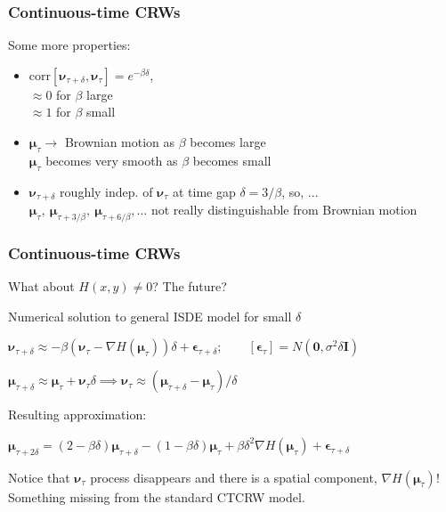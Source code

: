 \documentclass[36pt]{beamer}
\newcommand{\ft}[1]{\frametitle{#1}}
\newcommand{\bigsep}{\itemsep=1.5\baselineskip}
\newcommand{\bmu}{\boldsymbol{\mu}}
\newcommand{\be}{\boldsymbol{\epsilon}}
\newcommand{\bv}{\boldsymbol{\nu}}
\begin{document}
\begin{frame}
\ft{Continuous-time CRWs}
Some more properties: 
\medskip

\begin{itemize}
\bigsep
\item $\mbox{corr}[\bv_{\tau+\delta},\bv_\tau] = e^{-\beta\delta}$,\\
$\approx 0$ for $\beta$ large\\
$\approx 1$ for $\beta$ small
\pause
\item $\bmu_\tau \to$ Brownian motion as $\beta$ becomes large\\
$\bmu_\tau$ becomes very smooth as $\beta$ becomes small
\pause
\item $\bv_{\tau+\delta}$ roughly indep. of $\bv_\tau$ at time gap $\delta = 3/\beta$, so, ...\medskip \\
$\bmu_\tau,\ \bmu_{\tau+3/\beta},\ \bmu_{\tau+6/\beta},\dots$ not really distinguishable from Brownian motion
\end{itemize}
\vfill
\end{frame}


\begin{frame}
\ft{Continuous-time CRWs}
What about $H(x,y) \ne 0$? The future?
\medskip

\pause

\begin{block}{Numerical solution to general ISDE model}
for small $\delta$

$\bv_{\tau+\delta} \approx -\beta(\bv_\tau - \nabla H(\bmu_\tau) )\delta + \be_{\tau+\delta};\qquad [\be_{\tau}]=N(\mathbf{0},\sigma^2\delta\mathbf{I})$
\medskip

$\bmu_{\tau+\delta} \approx \bmu_\tau + \bv_\tau \delta \implies \bv_\tau \approx (\bmu_{\tau+\delta}-\bmu_\tau)/\delta$
\bigskip

Resulting approximation:

$
\bmu_{\tau+2\delta} = (2-\beta\delta)\bmu_{\tau+\delta} -  (1-\beta\delta)\bmu_\tau + \beta\delta^2 \nabla H(\bmu_\tau) + \be_{\tau+\delta}
$
\end{block}
\medskip

\pause

Notice that $\bv_\tau$ process disappears and there is a spatial component, $\nabla H(\bmu_\tau)$! Something missing from the standard CTCRW model.


\end{frame}


\end{document}
